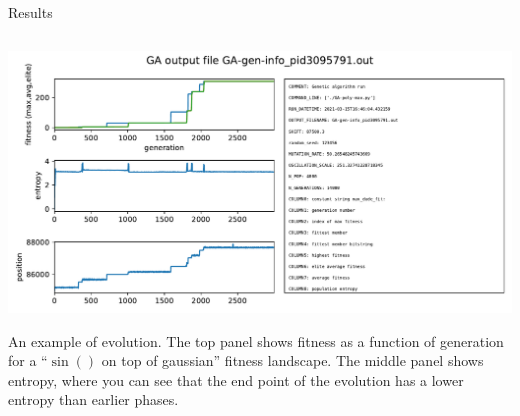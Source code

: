 \documentclass[10pt,aspectratio=169]{beamer}
\begin{document}
\begin{frame}{Results}
  \begin{columns} %
    \begin{column}{0.4\textwidth}
      \includegraphics[width=\textwidth]{GA-gen-info_pid3095791.out.pdf}
                      {\tiny
                      	\begin{singlespace}
                      	 An example of evolution.  The top panel shows
                         fitness as a function of generation for a
                         ``$\sin()$ on top of gaussian'' fitness
                         landscape.  The middle panel shows entropy,
                         where you can see that the end point of the
                         evolution has a lower entropy than earlier
                         phases.
              			\end{singlespace}    
              }
    \end{column}


\end{columns}
\end{frame}
\end{document}

